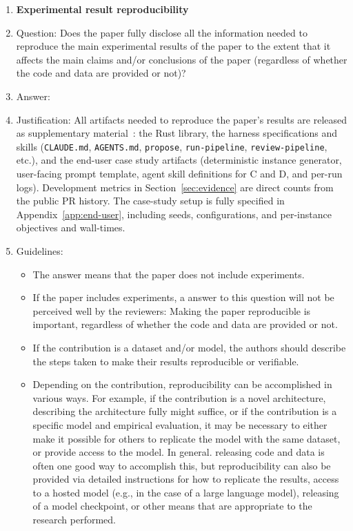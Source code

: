\begin{enumerate}
    \item {\bf Experimental result reproducibility}
    \item[] Question: Does the paper fully disclose all the information needed to reproduce the main experimental results of the paper to the extent that it affects the main claims and/or conclusions of the paper (regardless of whether the code and data are provided or not)?
    \item[] Answer: \answerYes{}
    \item[] Justification: All artifacts needed to reproduce the paper's results are released as supplementary material~\cite{Supplement}: the Rust library, the harness specifications and skills (\texttt{CLAUDE.md}, \texttt{AGENTS.md}, \texttt{propose}, \texttt{run-pipeline}, \texttt{review-pipeline}, etc.), and the end-user case study artifacts (deterministic instance generator, user-facing prompt template, agent skill definitions for C and D, and per-run logs). Development metrics in Section~\ref{sec:evidence} are direct counts from the public PR history. The case-study setup is fully specified in Appendix~\ref{app:end-user}, including seeds, configurations, and per-instance objectives and wall-times.
    \item[] Guidelines:
    \begin{itemize}
        \item The answer \answerNA{} means that the paper does not include experiments.
        \item If the paper includes experiments, a \answerNo{} answer to this question will not be perceived well by the reviewers: Making the paper reproducible is important, regardless of whether the code and data are provided or not.
        \item If the contribution is a dataset and\slash or model, the authors should describe the steps taken to make their results reproducible or verifiable.
        \item Depending on the contribution, reproducibility can be accomplished in various ways. For example, if the contribution is a novel architecture, describing the architecture fully might suffice, or if the contribution is a specific model and empirical evaluation, it may be necessary to either make it possible for others to replicate the model with the same dataset, or provide access to the model. In general. releasing code and data is often one good way to accomplish this, but reproducibility can also be provided via detailed instructions for how to replicate the results, access to a hosted model (e.g., in the case of a large language model), releasing of a model checkpoint, or other means that are appropriate to the research performed.

\end{itemize}
\end{enumerate}
